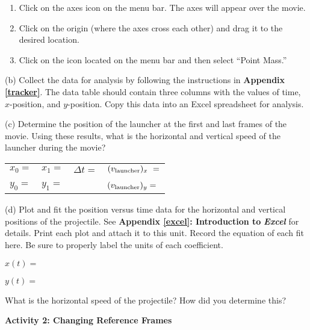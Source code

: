 \begin{enumerate}
\item Click on the axes icon on the menu bar.
The axes will appear over the movie. 

\item Click on the origin (where the axes cross each other) and drag it to
the desired location.

\item Click on the  icon located on the menu bar and then select ``Point Mass.''
\end{enumerate}

(b) Collect the data for analysis by following the instructions in
\textbf{Appendix \ref{tracker}}. The data table should contain three columns with
the values of time, $x$-position, and $y$-position. Copy this data into an Excel spreadsheet for analysis.

(c) Determine the position of the launcher at the first and last frames
of the movie. Using these results, what is the horizontal and vertical
speed of the launcher during the movie?

\vspace{0.3cm}
{\centering \begin{tabular}{p{20mm}p{20mm}p{30mm}p{70mm}}
\( x_{0}= \) &
\( x_{1}= \)&
\( \Delta t= \)&
\( (v_{\rm launcher})_{x}\ = \) \\
&
&
&
\\
\( y_{0}= \)&
\( y_{1}= \) &
&
\( (v_{\rm launcher})_{y} =\) \\
\end{tabular}\par}
\vspace{0.3cm}

(d) Plot and fit the position versus time data for the horizontal
and vertical positions of the projectile. See \textbf{Appendix \ref{excel}:
Introduction to} \textbf{\emph{Excel}} for details. Print each
plot and attach it to this unit. Record the equation of each fit here.
Be sure to properly label the units of each coefficient.

$x(t) =$
\vspace*{5mm}

$y(t) =$
\vspace{5mm}

What is the horizontal speed of the projectile? How did you determine
this?
\vspace{2in}

\textbf{Activity 2: Changing Reference Frames}


